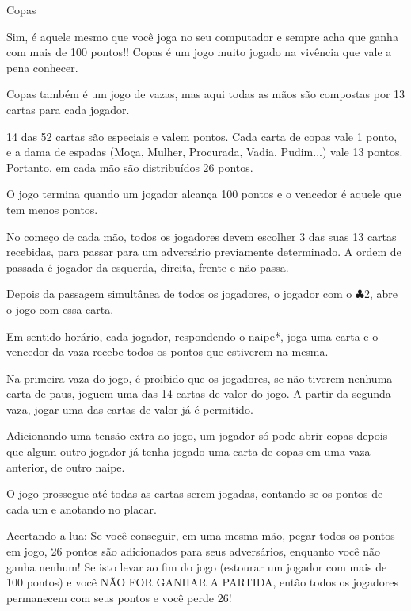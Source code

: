 \begin{subsecao}{Copas}

Sim, é aquele mesmo que você joga no seu computador e sempre acha que ganha com
mais de 100 pontos!! Copas é um jogo muito jogado na vivência que vale a
pena conhecer.

Copas também é um jogo de vazas, mas aqui todas as mãos são compostas por 13
cartas para cada jogador.

14 das 52 cartas são especiais e valem pontos. Cada carta de copas vale 1
ponto, e a dama de espadas (Moça, Mulher, Procurada, Vadia, Pudim...) vale 13
pontos. Portanto, em cada mão são distribuídos 26 pontos.

O jogo termina quando um jogador alcança 100 pontos e o vencedor é aquele que
tem menos pontos.

No começo de cada mão, todos os jogadores devem escolher 3 das suas 13 cartas
recebidas, para passar para um adversário previamente determinado. A ordem de
passada é jogador da esquerda, direita, frente e não passa.

Depois da passagem simultânea de todos os jogadores, o jogador com
o $\clubsuit$2, abre o jogo com essa carta.

Em sentido horário, cada jogador, respondendo o naipe*, joga uma carta e o
vencedor da vaza recebe todos os pontos que estiverem na mesma.

Na primeira vaza do jogo, é proibido que os jogadores, se não tiverem nenhuma
carta de paus, joguem uma das 14 cartas de valor do jogo. A partir da segunda
vaza, jogar uma das cartas de valor já é permitido.

Adicionando uma tensão extra ao jogo, um jogador só pode abrir copas depois que
algum outro jogador já tenha jogado uma carta de copas em uma vaza anterior, de
outro naipe.

O jogo prossegue até todas as cartas serem jogadas, contando-se os pontos de
cada um e anotando no placar.

Acertando a lua: Se você conseguir, em uma mesma mão, pegar todos os pontos em
jogo, 26 pontos são adicionados para seus adversários, enquanto você não ganha
nenhum! Se isto levar ao fim do jogo (estourar um jogador com mais de 100
pontos) e você NÃO FOR GANHAR A PARTIDA, então todos os jogadores permanecem
com seus pontos e você perde 26!

\end{subsecao}
